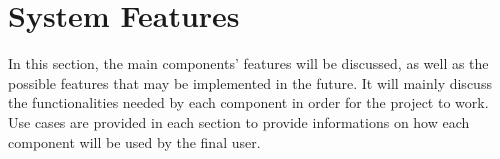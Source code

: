 \section{System Features}

In this section, the main components' features will be discussed, as well as the possible features that may be implemented in the future.
It will mainly discuss the functionalities needed by each component in order for the project to work. \newline
Use cases are provided in each section to provide informations on how each component will be used by the final user. 

\label{sec:system-features}




